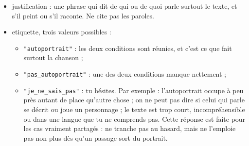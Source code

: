 \begin{itemize}
\item justification : une phrase qui dit de qui ou de quoi parle surtout le texte, et s'il peint ou s'il raconte. Ne cite pas les paroles.
\item etiquette, trois valeurs possibles :
\begin{itemize}
\item \texttt{"autoportrait"} : les deux conditions sont réunies, et c'est ce que fait surtout la chanson ;
\item \texttt{"pas\_autoportrait"} : une des deux conditions manque nettement ;
\item \texttt{"je\_ne\_sais\_pas"} : tu hésites. Par exemple : l'autoportrait occupe à peu près autant de place qu'autre chose ; on ne peut pas dire si celui qui parle se décrit ou joue un personnage ; le texte est trop court, incompréhensible ou dans une langue que tu ne comprends pas. Cette réponse est faite pour les cas vraiment partagés : ne tranche pas au hasard, mais ne l'emploie pas non plus dès qu'un passage sort du portrait.
\end{itemize}
\end{itemize}
\endgroup
